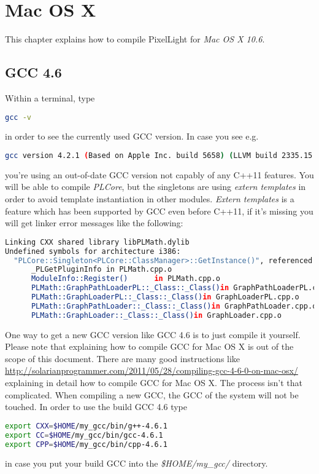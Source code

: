 \chapter{Mac OS X}
This chapter explains how to compile PixelLight for \emph{Mac OS X 10.6}.



\section{\ac{GCC} 4.6}
Within a terminal, type
\begin{lstlisting}[language=sh]
gcc -v
\end{lstlisting}
in order to see the currently used \ac{GCC} version. In case you see e.g.
\begin{lstlisting}[language=sh]
gcc version 4.2.1 (Based on Apple Inc. build 5658) (LLVM build 2335.15.00)
\end{lstlisting}
you're using an out-of-date \ac{GCC} version not capably of any C++11 features. You will be able to compile \emph{PLCore}, but the singletons are using \emph{extern templates} in order to avoid template instantiation in other modules. \emph{Extern templates} is a feature which has been supported by \ac{GCC} even before C++11, if it's missing you will get linker error messages like the following:
\begin{lstlisting}[language=sh]
Linking CXX shared library libPLMath.dylib
Undefined symbols for architecture i386:
  "PLCore::Singleton<PLCore::ClassManager>::GetInstance()", referenced from:
      _PLGetPluginInfo in PLMath.cpp.o
      ModuleInfo::Register()      in PLMath.cpp.o
      PLMath::GraphPathLoaderPL::_Class::_Class()in GraphPathLoaderPL.cpp.o
      PLMath::GraphLoaderPL::_Class::_Class()in GraphLoaderPL.cpp.o
      PLMath::GraphPathLoader::_Class::_Class()in GraphPathLoader.cpp.o
      PLMath::GraphLoader::_Class::_Class()in GraphLoader.cpp.o
\end{lstlisting}

One way to get a new \ac{GCC} version like \ac{GCC} 4.6 is to just compile it yourself. Please note that explaining how to compile \ac{GCC} for Mac OS X is out of the scope of this document. There are many good instructions like \url{http://solarianprogrammer.com/2011/05/28/compiling-gcc-4-6-0-on-mac-osx/} explaining in detail how to compile \ac{GCC} for Mac OS X. The process isn't that complicated. When compiling a new \ac{GCC}, the \ac{GCC} of the system will not be touched. In order to use the build \ac{GCC} 4.6 type
\begin{lstlisting}[language=sh]
export CXX=$HOME/my_gcc/bin/g++-4.6.1
export CC=$HOME/my_gcc/bin/gcc-4.6.1
export CPP=$HOME/my_gcc/bin/cpp-4.6.1
\end{lstlisting}
in case you put your build \ac{GCC} into the \emph{\$HOME/my\_gcc/} directory.

